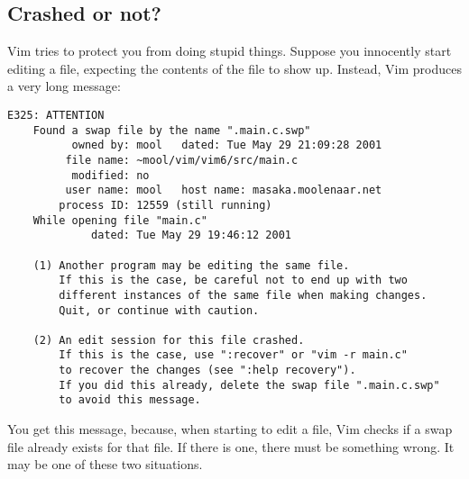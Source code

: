 \subsection{Crashed or not?}
\label{ATTENTION}
\label{E325}
Vim tries to protect you from doing stupid things.
Suppose you innocently start editing a file, expecting the contents of the file to show up.
Instead, Vim produces a very long message:

\begin{Verbatim}[samepage=true]
        E325: ATTENTION
    Found a swap file by the name ".main.c.swp"
          owned by: mool   dated: Tue May 29 21:09:28 2001
         file name: ~mool/vim/vim6/src/main.c
          modified: no
         user name: mool   host name: masaka.moolenaar.net
        process ID: 12559 (still running)
    While opening file "main.c"
             dated: Tue May 29 19:46:12 2001

    (1) Another program may be editing the same file.
        If this is the case, be careful not to end up with two
        different instances of the same file when making changes.
        Quit, or continue with caution.

    (2) An edit session for this file crashed.
        If this is the case, use ":recover" or "vim -r main.c"
        to recover the changes (see ":help recovery").
        If you did this already, delete the swap file ".main.c.swp"
        to avoid this message.
\end{Verbatim}

You get this message, because, when starting to edit a file, Vim checks if a swap file already exists for that file.
If there is one, there must be something wrong.
It may be one of these two situations.

